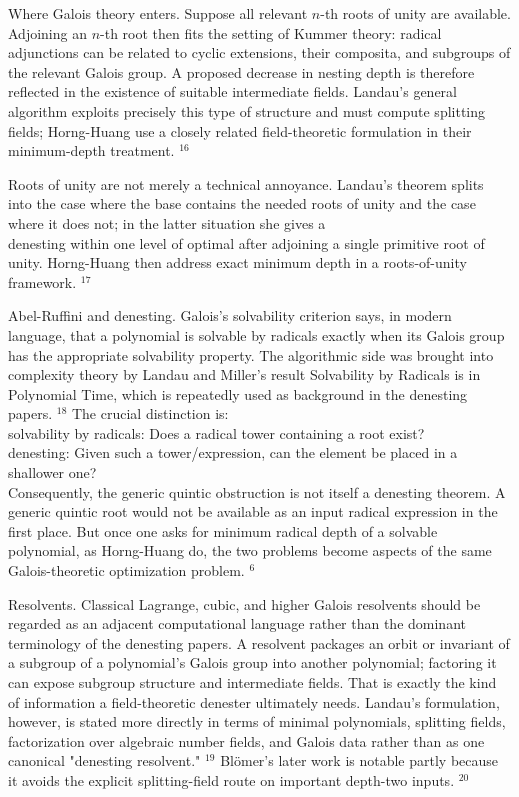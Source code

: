 \documentclass[10pt]{article}
\begin{document}
Where Galois theory enters. Suppose all relevant $n$-th roots of unity are available. Adjoining an $n$-th root then fits the setting of Kummer theory: radical adjunctions can be related to cyclic extensions, their composita, and subgroups of the relevant Galois group. A proposed decrease in nesting depth is therefore reflected in the existence of suitable intermediate fields. Landau's general algorithm exploits precisely this type of structure and must compute splitting fields; Horng-Huang use a closely related field-theoretic formulation in their minimum-depth treatment. ${ }^{16}$

Roots of unity are not merely a technical annoyance. Landau's theorem splits into the case where the base contains the needed roots of unity and the case where it does not; in the latter situation she gives a\\
denesting within one level of optimal after adjoining a single primitive root of unity. Horng-Huang then address exact minimum depth in a roots-of-unity framework. ${ }^{17}$

Abel-Ruffini and denesting. Galois's solvability criterion says, in modern language, that a polynomial is solvable by radicals exactly when its Galois group has the appropriate solvability property. The algorithmic side was brought into complexity theory by Landau and Miller's result Solvability by Radicals is in Polynomial Time, which is repeatedly used as background in the denesting papers. ${ }^{18}$ The crucial distinction is:\\
solvability by radicals: Does a radical tower containing a root exist?\\
denesting: Given such a tower/expression, can the element be placed in a shallower one?\\
Consequently, the generic quintic obstruction is not itself a denesting theorem. A generic quintic root would not be available as an input radical expression in the first place. But once one asks for minimum radical depth of a solvable polynomial, as Horng-Huang do, the two problems become aspects of the same Galois-theoretic optimization problem. ${ }^{6}$

Resolvents. Classical Lagrange, cubic, and higher Galois resolvents should be regarded as an adjacent computational language rather than the dominant terminology of the denesting papers. A resolvent packages an orbit or invariant of a subgroup of a polynomial's Galois group into another polynomial; factoring it can expose subgroup structure and intermediate fields. That is exactly the kind of information a field-theoretic denester ultimately needs. Landau's formulation, however, is stated more directly in terms of minimal polynomials, splitting fields, factorization over algebraic number fields, and Galois data rather than as one canonical "denesting resolvent." ${ }^{19}$ Blömer's later work is notable partly because it avoids the explicit splitting-field route on important depth-two inputs. ${ }^{20}$
\end{document}

